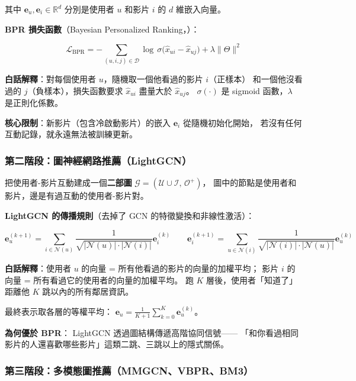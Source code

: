 \documentclass[12pt, a4paper]{article}
\begin{document}
其中 $\mathbf{e}_u, \mathbf{e}_i \in \mathbb{R}^d$ 分別是使用者 $u$ 和影片 $i$ 的 $d$ 維嵌入向量。

\textbf{BPR 損失函數}（Bayesian Personalized Ranking，\citealt{rendle2009bpr}）：

\begin{equation}
\mathcal{L}_{\text{BPR}} =
-\sum_{(u,i,j) \in \mathcal{D}} \log\,\sigma\!\bigl(\hat{x}_{ui} - \hat{x}_{uj}\bigr)
+ \lambda \|\Theta\|^2
\label{eq:bpr}
\end{equation}

\textbf{白話解釋}：對每個使用者 $u$，隨機取一個他看過的影片 $i$（正樣本）
和一個他沒看過的 $j$（負樣本），損失函數要求 $\hat{x}_{ui}$ 盡量大於 $\hat{x}_{uj}$。
$\sigma(\cdot)$ 是 sigmoid 函數，$\lambda$ 是正則化係數。

\textbf{核心限制}：新影片（包含冷啟動影片）的嵌入 $\mathbf{e}_i$ 從隨機初始化開始，
若沒有任何互動記錄，就永遠無法被訓練更新。

\subsubsection{第二階段：圖神經網路推薦（LightGCN）}

\citet{he2020lightgcn} 把使用者-影片互動建成一個\textbf{二部圖}
$\mathcal{G} = (\mathcal{U} \cup \mathcal{I},\, \mathcal{O}^+)$，
圖中的節點是使用者和影片，邊是有過互動的使用者-影片對。

\textbf{LightGCN 的傳播規則}（去掉了 GCN 的特徵變換和非線性激活）：

\begin{equation}
\mathbf{e}_u^{(k+1)} = \sum_{i \in \mathcal{N}(u)} \frac{1}{\sqrt{|\mathcal{N}(u)| \cdot |\mathcal{N}(i)|}} \mathbf{e}_i^{(k)}
\quad\quad
\mathbf{e}_i^{(k+1)} = \sum_{u \in \mathcal{N}(i)} \frac{1}{\sqrt{|\mathcal{N}(i)| \cdot |\mathcal{N}(u)|}} \mathbf{e}_u^{(k)}
\label{eq:lightgcn}
\end{equation}

\textbf{白話解釋}：使用者 $u$ 的向量 = 所有他看過的影片的向量的加權平均；
影片 $i$ 的向量 = 所有看過它的使用者的向量的加權平均。
跑 $K$ 層後，使用者「知道了」距離他 $K$ 跳以內的所有鄰居資訊。

最終表示取各層的等權平均：
$\mathbf{e}_u = \frac{1}{K+1}\sum_{k=0}^{K}\mathbf{e}_u^{(k)}$。

\textbf{為何優於 BPR}：
LightGCN 透過圖結構傳遞高階協同信號——
「和你看過相同影片的人還喜歡哪些影片」這類二跳、三跳以上的隱式關係。

\subsubsection{第三階段：多模態圖推薦（MMGCN、VBPR、BM3）}
\end{document}

